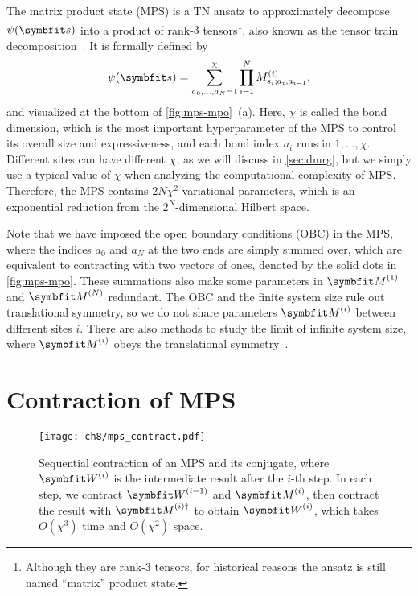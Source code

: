 The matrix product state (MPS) is a TN ansatz to approximately decompose $\psi(\vs)$ into a product of rank-$3$ tensors\footnote{Although they are rank-$3$ tensors, for historical reasons the ansatz is still named ``matrix'' product state.}, also known as the tensor train decomposition~\cite{oseledets2011tensor}. It is formally defined by
\begin{equation}
\psi(\vs) = \sum_{a_0, \ldots, a_N = 1}^\chi \prod_{i = 1}^N M^{(i)}_{s_i; a_i, a_{i - 1}},
\label{eq:mps}
\end{equation}
and visualized at the bottom of \cref{fig:mps-mpo}~(a). Here, $\chi$ is called the bond dimension, which is the most important hyperparameter of the MPS to control its overall size and expressiveness, and each bond index $a_i$ runs in $1, \ldots, \chi$. Different sites can have different $\chi$, as we will discuss in \cref{sec:dmrg}, but we simply use a typical value of $\chi$ when analyzing the computational complexity of MPS. Therefore, the MPS contains $2 N \chi^2$ variational parameters, which is an exponential reduction from the $2^N$-dimensional Hilbert space.

Note that we have imposed the open boundary conditions (OBC) in the MPS, where the indices $a_0$ and $a_N$ at the two ends are simply summed over, which are equivalent to contracting with two vectors of ones, denoted by the solid dots in \cref{fig:mps-mpo}. These summations also make some parameters in $\mM^{(1)}$ and $\mM^{(N)}$ redundant. The OBC and the finite system size rule out translational symmetry, so we do not share parameters $\mM^{(i)}$ between different sites $i$. There are also methods to study the limit of infinite system size, where $\mM^{(i)}$ obeys the translational symmetry~\cite{mcculloch2008infinite}.

\section{Contraction of MPS}
\label{sec:mps-contract}

\begin{figure}[htb]
\centering
\texttt{[image: ch8/mps\_contract.pdf]} \hspace*{0.1\linewidth}
\caption[Sequential contraction of MPS]{
Sequential contraction of an MPS and its conjugate, where $\mW^{(i)}$ is the intermediate result after the $i$-th step. In each step, we contract $\mW^{(i - 1)}$ and $\mM^{(i)}$, then contract the result with $\mM^{(i) \dagger}$ to obtain $\mW^{(i)}$, which takes $O(\chi^3)$ time and $O(\chi^2)$ space.
}
\label{fig:mps-contract}
\end{figure}

